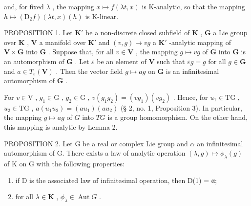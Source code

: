and, for fixed \(\lambda\) , the mapping \(x \mapsto f(\lambda t, x)\) is K-analytic, so that the mapping \(h \mapsto (\mathrm{D}_2f)(\lambda t, x)(h)\) is K-linear.

PROPOSITION 1. Let \(\mathbf{K}'\) be a non-discrete closed subfield of \(\mathbf{K}\) , \(\mathbf{G}\) a Lie group over \(\mathbf{K}\) , \(\mathbf{V}\) a manifold over \(\mathbf{K}'\) and \((v, g) \mapsto vg\) a \(\mathbf{K}'\) -analytic mapping of \(\mathbf{V} \times \mathbf{G}\) into \(\mathbf{G}\) . Suppose that, for all \(v \in \mathbf{V}\) , the mapping \(g \mapsto vg\) of \(\mathbf{G}\) into \(\mathbf{G}\) is an automorphism of \(\mathbf{G}\) . Let \(\varepsilon\) be an element of \(\mathbf{V}\) such that \(\varepsilon g = g\) for all \(g \in \mathbf{G}\) and \(a \in T_{\varepsilon}(\mathbf{V})\) . Then the vector field \(g \mapsto ag\) on \(\mathbf{G}\) is an infinitesimal automorphism of \(\mathbf{G}\) .

For \(v \in \mathrm{V}\) , \(g_1 \in \mathrm{G}\) , \(g_2 \in \mathrm{G}\) , \(v(g_1g_2) = (vg_1)(vg_2)\) . Hence, for \(u_1 \in \mathrm{TG}\) , \(u_2 \in \mathrm{TG}\) , \(a(u_1u_2) = (au_1)(au_2)\) (§ 2, no. 1, Proposition 3). In particular, the mapping \(g \mapsto ag\) of \(G\) into \(TG\) is a group homomorphism. On the other hand, this mapping is analytic by Lemma 2.

PROPOSITION 2. Let G be a real or complex Lie group and \(\alpha\) an infinitesimal automorphism of G. There exists a law of analytic operation \((\lambda, g) \mapsto \phi_{\lambda}(g)\) of K on G with the following properties:

\begin{enumerate}
\def\labelenumi{(\arabic{enumi})}
\item
  if D is the associated law of infinitesimal operation, then D(1) = α;
\item
  for all \(\lambda \in \mathbf{K}\) , \(\phi_{\lambda} \in \operatorname{Aut} G\) .
\end{enumerate}


